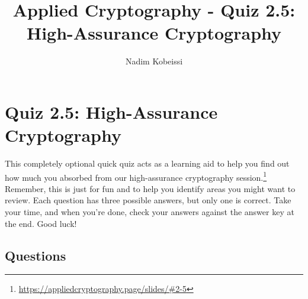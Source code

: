 \documentclass[10pt,a4paper,american]{exam}
\title{Applied Cryptography - Quiz 2.5: High-Assurance Cryptography}
\author{Nadim Kobeissi}
\begin{document}
\classhandoutheader
\section*{Quiz 2.5: High-Assurance Cryptography}

\begin{tcolorbox}[colframe=OliveGreen!30!white,colback=OliveGreen!5!white]
	This completely optional quick quiz acts as a learning aid to help you find out how much you absorbed from our high-assurance cryptography session.\footnote{\url{https://appliedcryptography.page/slides/\#2-5}} Remember, this is just for fun and to help you identify areas you might want to review. Each question has three possible answers, but only one is correct. Take your time, and when you're done, check your answers against the answer key at the end. Good luck!
\end{tcolorbox}

\subsection*{Questions}
\end{document}
